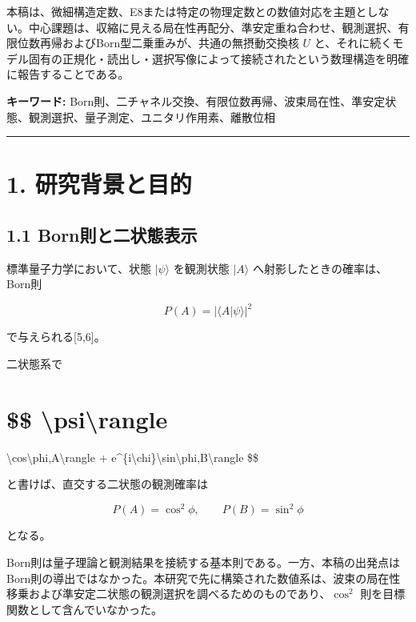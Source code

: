 \documentclass[
  a4paper,
  10pt]{article}
\begin{document}
本稿は、微細構造定数、E8または特定の物理定数との数値対応を主題としない。中心課題は、収縮に見える局在性再配分、準安定重ね合わせ、観測選択、有限位数再帰およびBorn型二乗重みが、共通の無摂動交換核
\(U\)
と、それに続くモデル固有の正規化・読出し・選択写像によって接続されたという数理構造を明確に報告することである。

\textbf{キーワード:}
Born則、二チャネル交換、有限位数再帰、波束局在性、準安定状態、観測選択、量子測定、ユニタリ作用素、離散位相

\begin{center}\rule{0.5\linewidth}{0.5pt}\end{center}

\section{1.
研究背景と目的}\label{1-ux7814ux7a76ux80ccux666fux3068ux76eeux7684}

\subsection{1.1
Born則と二状態表示}\label{11-bornux5247ux3068ux4e8cux72b6ux614bux8868ux793a}

標準量子力学において、状態 \(|\psi\rangle\) を観測状態 \(|A\rangle\)
へ射影したときの確率は、Born則

\[
P(A)=|\langle A|\psi\rangle|^2
\]

で与えられる{[}5,6{]}。

二状態系で

\section{\$\$
\textbar\textbackslash psi\textbackslash rangle}\label{-psirangle}

\textbackslash cos\textbackslash phi,\textbar A\textbackslash rangle +
e\^{}\{i\textbackslash chi\}\textbackslash sin\textbackslash phi,\textbar B\textbackslash rangle
\$\$

と書けば、直交する二状態の観測確率は

\[
P(A)=\cos^2\phi,
\qquad
P(B)=\sin^2\phi
\]

となる。

Born則は量子理論と観測結果を接続する基本則である。一方、本稿の出発点はBorn則の導出ではなかった。本研究で先に構築された数値系は、波束の局在性移乗および準安定二状態の観測選択を調べるためのものであり、\(\cos^2\)
則を目標関数として含んでいなかった。
\end{document}
